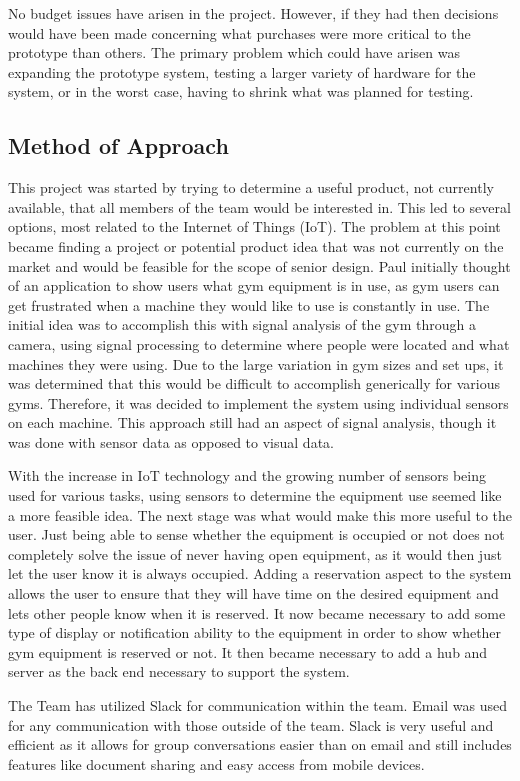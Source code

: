 \documentclass[PPFS.tex]{template/subfiles}
\begin{document}
    No budget issues have arisen in the project. However, if they had then decisions would have been made concerning what purchases were more critical to the prototype than others. The primary problem which could have arisen was expanding the prototype system, testing a larger variety of hardware for the system, or in the worst case, having to shrink what was planned for testing.
	
	\subsection{Method of Approach}
	This project was started by trying to determine a useful product, not currently available, that all members of the team would be interested in. This led to several options, most related to the Internet of Things (IoT). The problem at this point became finding a project or potential product idea that was not currently on the market and would be feasible for the scope of senior design. Paul initially thought of an application to show users what gym equipment is in use, as gym users can get frustrated when a machine they would like to use is constantly in use. The initial idea was to accomplish this with signal analysis of the gym through a camera, using signal processing to determine where people were located and what machines they were using. Due to the large variation in gym sizes and set ups, it was determined that this would be difficult to accomplish generically for various gyms. Therefore, it was decided to implement the system using individual sensors on each machine. This approach still had an aspect of signal analysis, though it was done with sensor data as opposed to visual data.
	
	With the increase in IoT technology and the growing number of sensors being used for various tasks, using sensors to determine the equipment use seemed like a more feasible idea. The next stage was what would make this more useful to the user. Just being able to sense whether the equipment is occupied or not does not completely solve the issue of never having open equipment, as it would then just let the user know it is always occupied. Adding a reservation aspect to the system allows the user to ensure that they will have time on the desired equipment and lets other people know when it is reserved. It now became necessary to add some type of display or notification ability to the equipment in order to show whether gym equipment is reserved or not. It then became necessary to add a hub and server as the back end necessary to support the system.
	
	The Team has utilized Slack for communication within the team. Email was used for any communication with those outside of the team. Slack is very useful and efficient as it allows for group conversations easier than on email and still includes features like document sharing and easy access from mobile devices. 
	
\end{document}
